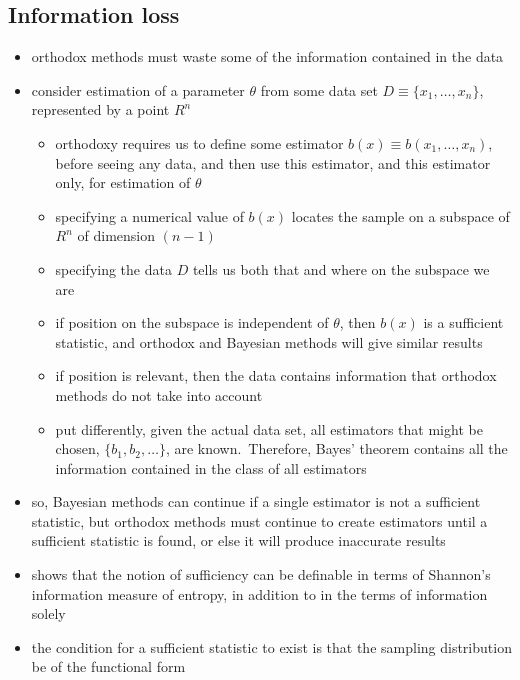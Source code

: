\documentclass[../jaynes_prob_theory_notes.tex]{subfiles}
\begin{document}
        \subsection{Information loss}
            \begin{itemize} 
                \item orthodox methods must waste some of the information contained in the data
                \item consider estimation of a parameter \(\theta\) from some data set \(D \equiv \{x_1, \ldots, x_n\}\), represented by a point \(R^n\)
                    \begin{itemize} 
                        \item orthodoxy requires us to define some estimator \(b(x) \equiv b(x_1, \ldots, x_n)\), before seeing any data, and then use this estimator, and this estimator only, for estimation of \(\theta\)
                        \item specifying a numerical value of \(b(x)\) locates the sample on a subspace of \(R^n\) of dimension \((n-1)\)
                        \item specifying the data \(D\) tells us both that and where on the subspace we are 
                        \item if position on the subspace is independent of \(\theta\), then \(b(x)\) is a sufficient statistic, and orthodox and Bayesian methods will give similar results
                        \item if position is relevant, then the data contains information that orthodox methods do not take into account
                        \item put differently, given the actual data set, all estimators that might be chosen, \(\{b_1, b_2, \ldots\}\), are known.\ Therefore, Bayes' theorem contains all the information contained in the class of all estimators
                    \end{itemize}
                \item so, Bayesian methods can continue if a single estimator is not a sufficient statistic, but orthodox methods must continue to create estimators until a sufficient statistic is found, or else it will produce inaccurate results
                \item shows that the notion of sufficiency can be definable in terms of Shannon's information measure of entropy, in addition to in the terms of information solely
                \item the condition for a sufficient statistic to exist is that the sampling distribution be of the functional form

\end{itemize}
\end{document}

